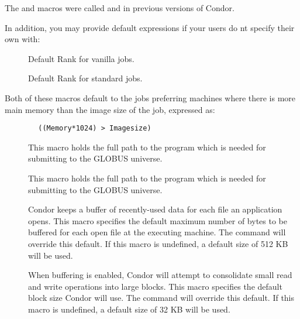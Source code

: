 \Note The  and 
 macros were called
 and
 in previous versions of Condor.

In addition, you may provide default  expressions if your users
do nt specify their own with:

\begin{description}

\item[] \label{param:DefaultRankVanilla}
  Default Rank for vanilla jobs.  

\item[] \label{param:DefaultRankStandard}
  Default Rank for standard jobs.


\end{description}

Both of these macros default to the jobs preferring machines where
there is more main memory than the image size of the job, expressed
as:
\begin{verbatim}
        ((Memory*1024) > Imagesize)
\end{verbatim}

\begin{description}
\item[] \label{param:Globusrun}
  This macro holds the full path to the  program which is
  needed for submitting to the GLOBUS universe.
\end{description}

\begin{description}
\item[] \label{param:GlobusShadow}
  This macro holds the full path to the  program 
  which is needed for submitting to the GLOBUS universe.
\end{description}

\begin{description}
\item[] \label{param:DefaultBufferSize}
  Condor keeps a buffer of recently-used data for each file an
  application opens.  This macro specifies the default maximum number
  of bytes to be buffered for each open file at the executing machine.
  The   command will override this
  default.  If this macro is undefined, a default size of 512 KB will
  be used.

\item[] 
  \label{param:DefaultBufferBlockSize} When buffering is enabled,
  Condor will attempt to consolidate small read and write operations
  into large blocks.  This macro specifies the default block size
  Condor will use.  The  
  command will override this default.  If this macro is undefined, a
  default size of 32 KB will be used.

\end{description}

